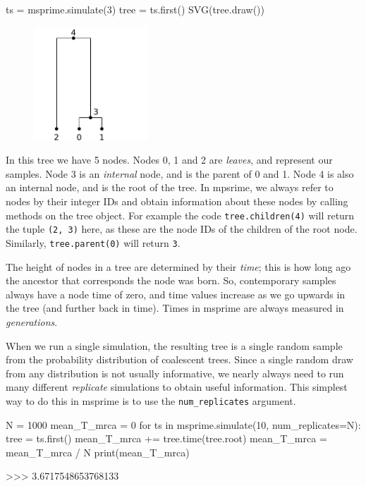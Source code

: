 \documentclass[graybox]{svmult}
\begin{document}
\begin{pythoncode}
ts = msprime.simulate(3)
tree = ts.first()
SVG(tree.draw())
\end{pythoncode}

\begin{figure}
  \begin{center}
    \includegraphics[width=0.38\textwidth]{images/simulations_5_0.pdf}
  \end{center}
\end{figure}

    In this tree we have 5 nodes. Nodes 0, 1 and 2 are \emph{leaves}, and
represent our samples. Node 3 is an \emph{internal} node, and is the
parent of 0 and 1. Node 4 is also an internal node, and is the root of
the tree. In mpsrime, we always refer to nodes by their integer IDs and
obtain information about these nodes by calling methods on the tree
object. For example the code \texttt{tree.children(4)} will return the
tuple \texttt{(2,\ 3)} here, as these are the node IDs of the children
of the root node. Similarly, \texttt{tree.parent(0)} will return
\texttt{3}.

The height of nodes in a tree are determined by their \emph{time}; this
is how long ago the ancestor that corresponds the node was born. So,
contemporary samples always have a node time of zero, and time values
increase as we go upwards in the tree (and further back in time). Times
in msprime are always measured in \emph{generations}.

When we run a single simulation, the resulting tree is a single random
sample from the probability distribution of coalescent trees. Since a
single random draw from any distribution is not usually informative, we
nearly always need to run many different \emph{replicate} simulations to
obtain useful information. This simplest way to do this in msprime is to
use the \texttt{num\_replicates} argument.

\begin{pythoncode}
N = 1000
mean_T_mrca = 0
for ts in msprime.simulate(10, num_replicates=N):
    tree = ts.first()
    mean_T_mrca += tree.time(tree.root)
mean_T_mrca = mean_T_mrca / N
print(mean_T_mrca)

>>> 3.6717548653768133
\end{pythoncode}
\end{document}
